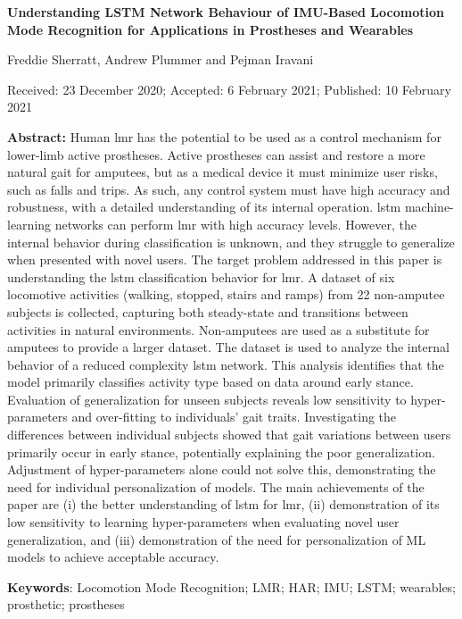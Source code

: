 {\huge\textbf{Understanding LSTM Network Behaviour of IMU-Based Locomotion Mode Recognition for Applications in Prostheses and Wearables}\par}

Freddie Sherratt, Andrew Plummer and Pejman Iravani

Received: 23 December 2020; Accepted: 6 February 2021; Published: 10 February 2021

\textbf{Abstract:} Human \acrfull{lmr} has the potential to be used as a control mechanism for lower-limb active prostheses. Active prostheses can assist and restore a more natural gait for amputees, but as a medical device it must minimize user risks, such as falls and trips. As such, any control system must have high accuracy and robustness, with a detailed understanding of its internal operation. \acrfull{lstm} machine-learning networks can perform \acrshort{lmr} with high accuracy levels. However, the internal behavior during classification is unknown, and they struggle to generalize when presented with novel users. The target problem addressed in this paper is understanding the \acrshort{lstm} classification behavior for \acrshort{lmr}. A dataset of six locomotive activities (walking, stopped, stairs and ramps) from 22 non-amputee subjects is collected, capturing both steady-state and transitions between activities in natural environments. Non-amputees are used as a substitute for amputees to provide a larger dataset. The dataset is used to analyze the internal behavior of a reduced complexity \acrshort{lstm} network. This analysis identifies that the model primarily classifies activity type based on data around early stance. Evaluation of generalization for unseen subjects reveals low sensitivity to hyper-parameters and over-fitting to individuals’ gait traits. Investigating the differences between individual subjects showed that gait variations between users primarily occur in early stance, potentially explaining the poor generalization. Adjustment of hyper-parameters alone could not solve this, demonstrating the need for individual personalization of models. The main achievements of the paper are (i) the better understanding of \acrshort{lstm} for \acrshort{lmr}, (ii) demonstration of its low sensitivity to learning hyper-parameters when evaluating novel user generalization, and (iii) demonstration of the need for personalization of ML models to achieve acceptable accuracy.

\textbf{Keywords}: Locomotion Mode Recognition; LMR; HAR; IMU; LSTM; wearables; prosthetic; prostheses

